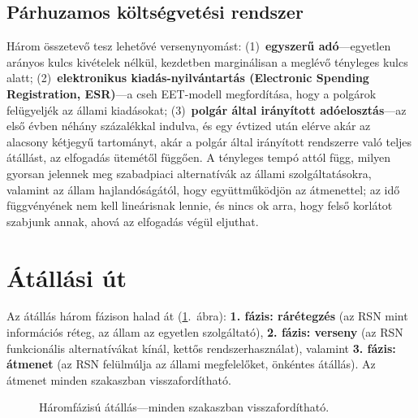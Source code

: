 \documentclass[11pt,a4paper,twocolumn]{article}
\begin{document}
\subsection{Párhuzamos költségvetési rendszer}

Három összetevő tesz lehetővé versenynyomást: (1)~\textbf{egyszerű adó}---egyetlen arányos kulcs kivételek nélkül, kezdetben marginálisan a meglévő tényleges kulcs alatt; (2)~\textbf{elektronikus kiadás-nyilvántartás (Electronic Spending Registration, ESR)}---a cseh EET-modell megfordítása, hogy a polgárok felügyeljék az állami kiadásokat; (3)~\textbf{polgár által irányított adóelosztás}---az első évben néhány százalékkal indulva, és egy évtized után elérve akár az alacsony kétjegyű tartományt, akár a polgár által irányított rendszerre való teljes átállást, az elfogadás ütemétől függően. A tényleges tempó attól függ, milyen gyorsan jelennek meg szabadpiaci alternatívák az állami szolgáltatásokra, valamint az állam hajlandóságától, hogy együttműködjön az átmenettel; az idő függvényének nem kell lineárisnak lennie, és nincs ok arra, hogy felső korlátot szabjunk annak, ahová az elfogadás végül eljuthat.

\section{Átállási út}

Az átállás három fázison halad át (\ref{fig:migration}.~ábra): \textbf{1. fázis: rárétegzés} (az RSN mint információs réteg, az állam az egyetlen szolgáltató), \textbf{2. fázis: verseny} (az RSN funkcionális alternatívákat kínál, kettős rendszerhasználat), valamint \textbf{3. fázis: átmenet} (az RSN felülmúlja az állami megfelelőket, önkéntes átállás). Az átmenet minden szakaszban visszafordítható.

\begin{figure}[ht]
\centering
{}
\caption{Háromfázisú átállás---minden szakaszban visszafordítható.}
\label{fig:migration}
\end{figure}
\end{document}
